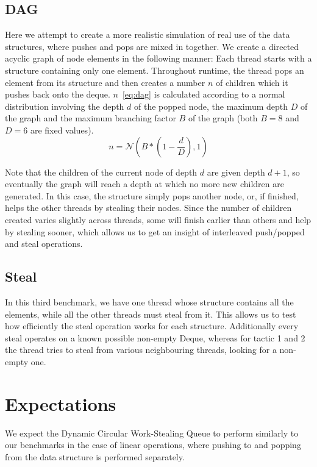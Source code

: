 \documentclass [10pt]{scrartcl}
\begin{document}
   \subsection{DAG} \label{subsec:dag}
   Here we attempt to create a more realistic simulation of real use of the data structures, where pushes and pops are mixed in together. We create a directed acyclic graph of node elements in the following manner:
   Each thread starts with a structure containing only one element. Throughout runtime, the thread pops an element from its structure and then creates a number $n$ of children which it pushes back onto the deque. $n$~\eqref{eq:dag} is calculated according to a normal distribution involving the depth $d$ of the popped node, the maximum depth $D$ of the graph and the maximum branching factor $B$ of the graph (both $B= 8$ and $D=6$ are fixed values).
   \begin{equation}\label{eq:dag}
   n = \mathcal{N}(B * (1 - \frac{d}{D}), 1)    
   \end{equation}
   
   Note that the children of the current node of depth $d$ are given depth $d+1$, so eventually the graph will reach a depth at which no more new children are generated. In this case, the structure simply pops another node, or, if finished, helps the other threads by stealing their nodes.
   Since the number of children created varies slightly across threads, some will finish earlier than others and help by stealing sooner, which allows us to get an insight of interleaved push/popped and steal operations.
   
   \subsection{Steal}
   In this third benchmark, we have one thread whose structure contains all the elements, while all the other threads must steal from it. This allows us to test how efficiently the steal operation works for each structure. Additionally every steal operates on a known possible non-empty Deque, whereas for tactic 1 and 2 the thread tries to steal from various neighbouring threads, looking for a non-empty one.
   
   
   \section{Expectations}
   We expect the Dynamic Circular Work-Stealing Queue to perform similarly to our benchmarks in the case of linear operations, where pushing to and popping from the data structure is performed separately.
   
\end{document}
